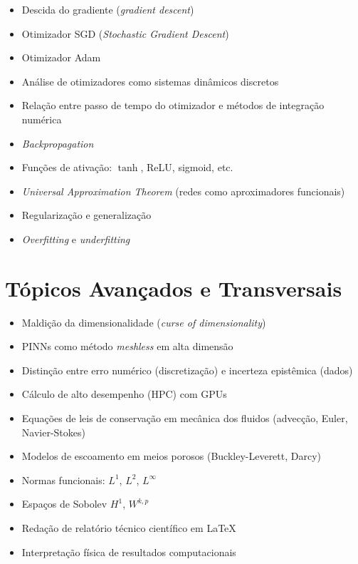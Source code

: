\documentclass[12pt, a4paper]{article}
\begin{document}
\begin{itemize}
    \item Descida do gradiente (\textit{gradient descent})
    \item Otimizador SGD (\textit{Stochastic Gradient Descent})
    \item Otimizador Adam
    \item Análise de otimizadores como sistemas dinâmicos discretos
    \item Relação entre passo de tempo do otimizador e métodos de integração numérica
    \item \textit{Backpropagation}
    \item Funções de ativação: $\tanh$, ReLU, sigmoid, etc.
    \item \textit{Universal Approximation Theorem} (redes como aproximadores funcionais)
    \item Regularização e generalização
    \item \textit{Overfitting} e \textit{underfitting}
\end{itemize}

\section*{Tópicos Avançados e Transversais}

\begin{itemize}
    \item Maldição da dimensionalidade (\textit{curse of dimensionality})
    \item PINNs como método \textit{meshless} em alta dimensão
    \item Distinção entre erro numérico (discretização) e incerteza epistêmica (dados)
    \item Cálculo de alto desempenho (HPC) com GPUs
    \item Equações de leis de conservação em mecânica dos fluidos (advecção, Euler, Navier-Stokes)
    \item Modelos de escoamento em meios porosos (Buckley-Leverett, Darcy)
    \item Normas funcionais: $L^1$, $L^2$, $L^\infty$
    \item Espaços de Sobolev $H^1$, $W^{k,p}$
    \item Redação de relatório técnico científico em \LaTeX
    \item Interpretação física de resultados computacionais
\end{itemize}
\end{document}
